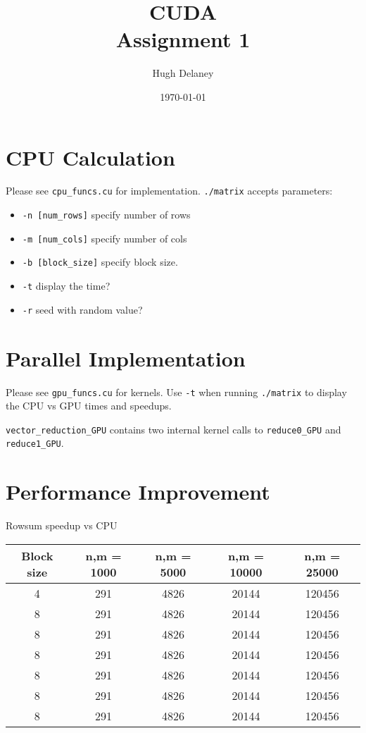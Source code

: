 \documentclass[a4paper, fleqn]{article}
\date{\today}
\author{Hugh Delaney}
\title{CUDA \\ Assignment 1}
\begin{document}
\maketitle
        \section{CPU Calculation}%
        Please see \texttt{cpu\_funcs.cu} for implementation. \texttt{./matrix} accepts parameters:
        \begin{itemize}
                \item \texttt{-n [num\_rows]} specify number of rows
                \item \texttt{-m [num\_cols]} specify number of cols
                \item \texttt{-b [block\_size]} specify block size.
                \item \texttt{-t} display the time?
                \item \texttt{-r} seed with random value?
        \end{itemize}
        \section{Parallel Implementation}%
        Please see \texttt{gpu\_funcs.cu} for kernels. Use \texttt{-t} when running \texttt{./matrix} to display the CPU vs GPU times and speedups. 

        \texttt{vector\_reduction\_GPU} contains two internal kernel calls to \texttt{reduce0\_GPU} and \texttt{reduce1\_GPU}.  
        \section{Performance Improvement}%
\begin{center}{Rowsum speedup vs CPU \\}
 \begin{tabular}{||c | c | c | c | c ||}
 \hline
 Block size & n,m = 1000 & n,m = 5000 & n,m = 10000 & n,m = 25000 \\ [0.5ex] 
 \hline
 4 & 291 & 4826 & 20144 & 120456 \\
 \hline
 8 & 291 & 4826 & 20144 & 120456 \\
 \hline
 8 & 291 & 4826 & 20144 & 120456 \\
 \hline
 8 & 291 & 4826 & 20144 & 120456 \\
 \hline
 8 & 291 & 4826 & 20144 & 120456 \\
 \hline
 8 & 291 & 4826 & 20144 & 120456 \\
 \hline
 8 & 291 & 4826 & 20144 & 120456 \\
 \hline

 \hline
\end{tabular}
\end{center}
        
\end{document}
